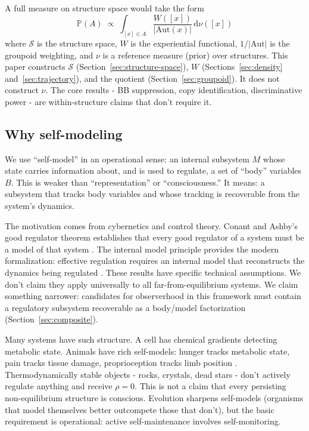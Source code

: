\documentclass[12pt]{article}
\theoremstyle{remark}
\newcommand{\Aut}{\mathrm{Aut}}
\begin{document}
A full measure on structure space would take the form
\begin{equation}\label{eq:full-measure-intro}
  \mathbb{P}(A) \;\propto\; \int_{[x] \in A} \frac{W([x])}{|\Aut(x)|}\,\mathrm{d}\nu([x])
\end{equation}
where $\mathcal{S}$ is the structure space, $W$ is the experiential functional, $1/|\Aut|$ is the groupoid weighting, and $\nu$ is a reference measure (prior) over structures. This paper constructs $\mathcal{S}$ (Section~\ref{sec:structure-space}), $W$ (Sections~\ref{sec:density} and~\ref{sec:trajectory}), and the quotient (Section~\ref{sec:groupoid}). It does not construct $\nu$. The core results - BB suppression, copy identification, discriminative power - are within-structure claims that don't require it.

\subsection{Why self-modeling}\label{sec:why-self-modeling}

We use ``self-model'' in an operational sense: an internal subsystem $M$ whose state carries information about, and is used to regulate, a set of ``body'' variables $B$. This is weaker than ``representation'' or ``consciousness.'' It means: a subsystem that tracks body variables and whose tracking is recoverable from the system's dynamics.

The motivation comes from cybernetics and control theory. Conant and Ashby's good regulator theorem establishes that every good regulator of a system must be a model of that system \cite{conant-ashby1970}. The internal model principle provides the modern formalization: effective regulation requires an internal model that reconstructs the dynamics being regulated \cite{francis-wonham1976}. These results have specific technical assumptions. We don't claim they apply universally to all far-from-equilibrium systems. We claim something narrower: candidates for observerhood in this framework must contain a regulatory subsystem recoverable as a body/model factorization (Section~\ref{sec:composite}).

Many systems have such structure. A cell has chemical gradients detecting metabolic state. Animals have rich self-models: hunger tracks metabolic state, pain tracks tissue damage, proprioception tracks limb position \cite{hampton2001,foote-crystal2007}. Thermodynamically stable objects - rocks, crystals, dead stars - don't actively regulate anything and receive $\rho = 0$. This is not a claim that every persisting non-equilibrium structure is conscious. Evolution sharpens self-models (organisms that model themselves better outcompete those that don't), but the basic requirement is operational: active self-maintenance involves self-monitoring.
\end{document}
